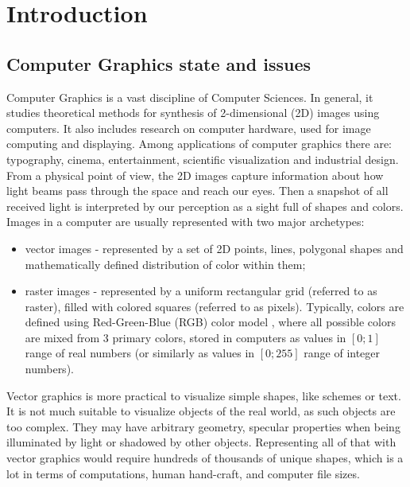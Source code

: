 \chapter{Introduction}\label{chapter:intro}

\section{Computer Graphics state and issues}\label{intro:cg}

Computer Graphics is a vast discipline of Computer Sciences. In general, it studies theoretical methods for synthesis of 2-dimensional (2D) images using computers. It also includes research on computer hardware, used for image computing and displaying. Among applications of computer graphics there are: typography, cinema, entertainment, scientific visualization and industrial design. From a physical point of view, the 2D images capture information about how light beams pass through the space and reach our eyes. Then a snapshot of all received light is interpreted by our perception as a sight full of shapes and colors. Images in a computer are usually represented with two major archetypes:

\begin{itemize}
	\item vector images \cite{aux:vector14} - represented by a set of 2D points, lines, polygonal shapes and mathematically defined distribution of color within them;
	\item raster images \cite{aux:raster94} - represented by a uniform rectangular grid (referred to as raster), filled with colored squares (referred to as pixels). Typically, colors are defined using Red-Green-Blue (RGB) color model \cite{aux:color05}, where all possible colors are mixed from 3 primary colors, stored in computers as values in $[0;1]$ range of real numbers (or similarly as values in $[0;255]$ range of integer numbers).
\end{itemize}

Vector graphics is more practical to visualize simple shapes, like schemes or text. It is not much suitable to visualize objects of the real world, as such objects are too complex. They may have arbitrary geometry, specular properties when being illuminated by light or shadowed by other objects. Representing all of that with vector graphics would require hundreds of thousands of unique shapes, which is a lot in terms of computations, human hand-craft, and computer file sizes. 

